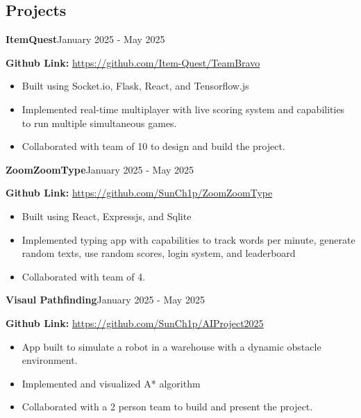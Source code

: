 \documentclass[12pt]{article}
\newcommand{\project}[4]{
    \noindent \textbf{#1}\normalsize \hfill #2
    \par
    \noindent #3
    #4
}
\begin{document}
\begin{spacing}{1}
        \section*{\Large \textbf{Projects}}
        \normalsize
        \project{ItemQuest}{January 2025 - May 2025}{\textbf{Github Link:} \url{https://github.com/Item-Quest/TeamBravo}}
        {
            \begin{itemize}
                \setlength\itemsep{0.01em}
                \item Built using Socket.io, Flask, React, and Tensorflow.js \par
                \item Implemented real-time multiplayer with live scoring system and capabilities to run multiple simultaneous games. \par
                \item Collaborated with team of 10 to design and build the project.
            \end{itemize}
            \par
        }
        \project{ZoomZoomType}{January 2025 - May 2025}{\textbf{Github Link:} \url{https://github.com/SunCh1p/ZoomZoomType}}
        {
            \begin{itemize}
                \setlength\itemsep{0.01em}
                \item Built using React, Expressjs, and Sqlite \par
                \item Implemented typing app with capabilities to track words per minute, generate random texts, use random scores, login system, and leaderboard  \par
                \item Collaborated with team of 4.
            \end{itemize}
            \par
        }
        \project{Visaul Pathfinding}{January 2025 - May 2025}{\textbf{Github Link:} \url{https://github.com/SunCh1p/AIProject2025}}
        {
            \begin{itemize}
                \setlength\itemsep{0.01em}
                \item App built to simulate a robot in a warehouse with a dynamic obstacle environment.
                \item Implemented and visualized A* algorithm  \par
                \item Collaborated with a 2 person team to build and present the project.
            \end{itemize}
            \par
        }
    \end{spacing}
\end{document}
